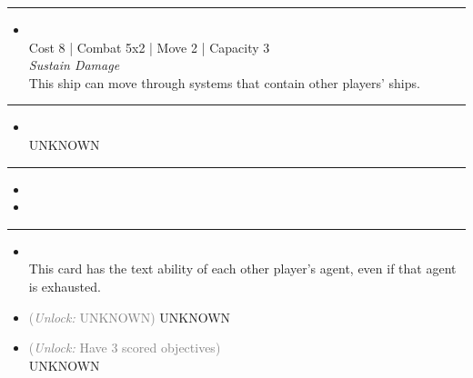\begin{multicols}{2}
\vspace{-10pt}\rule{\hsize}{0.4pt}\vspace{5pt}


\begin{itemize}
\item {}\\
Cost 8 | Combat 5x2 | Move 2 | Capacity 3 \\
\emph{Sustain Damage}\\
This ship can move through systems that contain other players' ships.
\end{itemize}

\vspace{-10pt}\rule{\hsize}{0.4pt}\vspace{5pt}


\begin{itemize}
\item {} %
\\
UNKNOWN
\end{itemize}

\vspace{-10pt}\rule{\hsize}{0.4pt}\vspace{5pt}

\nounits

\columnbreak
{}

\begin{itemize}
\item \transparasteel
\item \mageon
\end{itemize}

\vspace{-10pt}\rule{\hsize}{0.4pt}\vspace{5pt}


\begin{itemize}
\item {}\\
This card has the text ability of each other player's agent, even if that agent is exhausted. 
\item {} \textcolor{gray}{(\emph{Unlock:} UNKNOWN)} 
UNKNOWN
\item {} \textcolor{gray}{(\emph{Unlock:} Have 3 scored objectives)}\\
UNKNOWN
\end{itemize}


\end{multicols}
